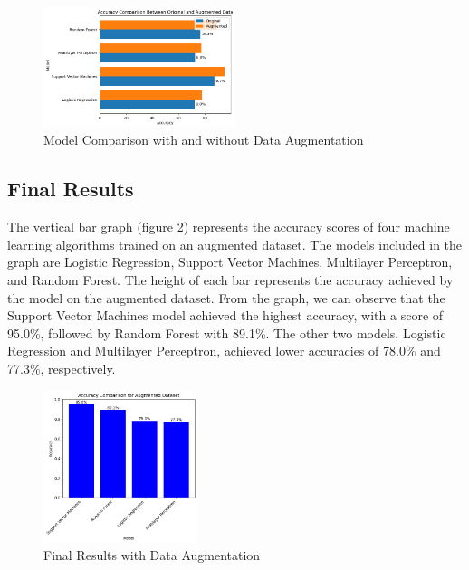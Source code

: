 \documentclass[conference]{IEEEtran}
\begin{document}
\begin{figure}[!h]
    \centering
    \includegraphics[width=0.5\textwidth]{assets/originalvsaugmented.png}
    \caption{Model Comparison with and without Data Augmentation}
    \label{fig:augmentation-comparison}
\end{figure}

\subsection{Final Results}

The vertical bar graph (figure \ref{fig:final-results}) represents the accuracy scores of four machine learning algorithms trained on an augmented dataset. The models included in the graph are Logistic Regression, Support Vector Machines, Multilayer Perceptron, and Random Forest. The height of each bar represents the accuracy achieved by the model on the augmented dataset. From the graph, we can observe that the Support Vector Machines model achieved the highest accuracy, with a score of 95.0\%, followed by Random Forest with 89.1\%. The other two models, Logistic Regression and Multilayer Perceptron, achieved lower accuracies of 78.0\% and 77.3\%, respectively. 

\begin{figure}[!h]
    \centering
    \includegraphics[width=0.4\textwidth]{assets/augmented-results.png}
    \caption{Final Results with Data Augmentation}
    \label{fig:final-results}
\end{figure}
\end{document}
